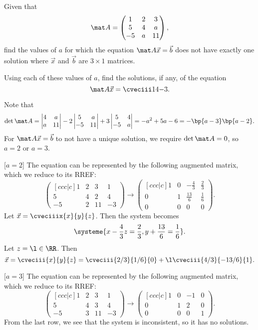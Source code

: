 \begin{problem}
    Given that \[\mat A = \begin{pmatrix}1 & 2 & 3 \\ 5 & 4 & a \\ -5 & a & 11\end{pmatrix},\] find the values of $a$ for which the equation $\mat A \vec x = \vec b$ does not have exactly one solution where $\vec x$ and $\vec b$ are $3 \times 1$ matrices.

    Using each of these values of $a$, find the solutions, if any, of the equation \[\mat A \vec x = \cveciii14{-3}.\]
\end{problem}
\begin{solution}
    Note that \[\det \mat A = \begin{vmatrix}4 & a \\ a & 11\end{vmatrix} - 2\begin{vmatrix}5 & a \\ -5 & 11\end{vmatrix} + 3\begin{vmatrix}5 & 4 \\ -5 & a\end{vmatrix} = -a^2 + 5a - 6 = -\bp{a-3}\bp{a-2}.\] For $\mat A \vec x = \vec b$ to not have a unique solution, we require $\det \mat A = 0$, so $a = 2$ or $a = 3$.

    [$a = 2$] The equation can be represented by the following augmented matrix, which we reduce to its RREF: \[\begin{pmatrix}[ccc|c] 1 & 2 & 3 & 1 \\ 5 & 4 & 2 & 4 \\ -5 & 2 & 11 & -3\end{pmatrix} \rightarrow \begin{pmatrix}[ccc|c] 1 & 0 & -\frac43 & \frac23 \\[0.5em] 0 & 1 & \frac{13}{6} & \frac16 \\[0.5em] 0 & 0 & 0 & 0\end{pmatrix}.\] Let $\vec x = \cveciiix{x}{y}{z}$. Then the system becomes \[\systeme{x - \frac43 z = \frac23, y + \frac{13}{6} = \frac16}.\] Let $z = \l \in \RR$. Then \[\vec x = \cveciii{x}{y}{z} = \cveciii{2/3}{1/6}{0} + \l \cveciii{4/3}{-13/6}{1}.\]

    [$a = 3$] The equation can be represented by the following augmented matrix, which we reduce to its RREF: \[\begin{pmatrix}[ccc|c] 1 & 2 & 3 & 1 \\ 5 & 4 & 3 & 4 \\ -5 & 3 & 11 & -3\end{pmatrix} \rightarrow \begin{pmatrix}[ccc|c] 1 & 0 & -1 & 0 \\ 0 & 1 & 2 & 0 \\ 0 & 0 & 0 & 1\end{pmatrix}.\] From the last row, we see that the system is inconsistent, so it has no solutions.
\end{solution}
